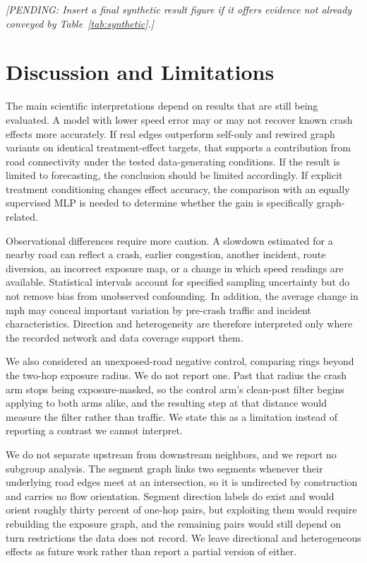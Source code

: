 \documentclass[sigconf,nonacm]{acmart}
\newcommand{\pending}[1]{\textcolor{pendinggray}{\emph{[PENDING: #1]}}}
\begin{document}
\pending{Insert a final synthetic result figure if it offers evidence
not already conveyed by Table~\ref{tab:synthetic}.}

\section{Discussion and Limitations}
The main scientific interpretations depend on results that are still
being evaluated. A model with lower speed error may or may not recover
known crash effects more accurately. If real edges outperform
self-only and rewired graph variants on identical treatment-effect
targets, that supports a contribution from road connectivity under
the tested data-generating conditions. If the result is limited to
forecasting, the conclusion should be limited accordingly. If
explicit treatment conditioning changes effect accuracy, the
comparison with an equally supervised MLP is needed to determine
whether the gain is specifically graph-related.

Observational differences require more caution. A slowdown estimated
for a nearby road can reflect a crash, earlier congestion, another
incident, route diversion, an incorrect exposure map, or a change in
which speed readings are available. Statistical intervals account for
specified sampling uncertainty but do not remove bias from unobserved
confounding. In addition, the average change in mph may conceal
important variation by pre-crash traffic and incident characteristics.
Direction and heterogeneity are therefore interpreted only where the
recorded network and data coverage support them.

We also considered an unexposed-road negative control, comparing rings
beyond the two-hop exposure radius. We do not report one. Past that radius the
crash arm stops being exposure-masked, so the control arm's clean-post filter
begins applying to both arms alike, and the resulting step at that distance
would measure the filter rather than traffic. We state this as a limitation
instead of reporting a contrast we cannot interpret.

We do not separate upstream from downstream neighbors, and we report no
subgroup analysis. The segment graph links two segments whenever their
underlying road edges meet at an intersection, so it is undirected by
construction and carries no flow orientation. Segment direction labels do
exist and would orient roughly thirty percent of one-hop pairs, but
exploiting them would require rebuilding the exposure graph, and the
remaining pairs would still depend on turn restrictions the data does not
record. We leave directional and heterogeneous effects as future work
rather than report a partial version of either.
\end{document}
